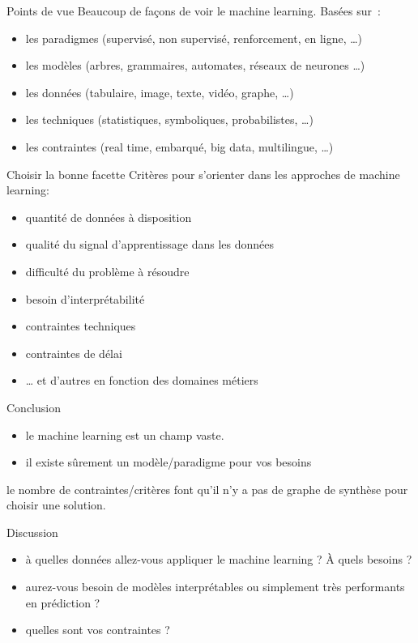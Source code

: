 \begin{frame}{Points de vue}
  Beaucoup de façons de voir le machine learning. Basées sur~:
  \begin{itemize}[<+->]
    \item les paradigmes (supervisé, non supervisé, renforcement, en
      ligne, …)
    \item les modèles (arbres, grammaires, automates, réseaux de
      neurones …)
    \item les données (tabulaire, image, texte, vidéo, graphe, …)
    \item les techniques (statistiques, symboliques, probabilistes, …)
    \item les contraintes (real time, embarqué, big data, multilingue,
      …)
  \end{itemize}

\end{frame}

\begin{frame}{Choisir la bonne facette}
  Critères pour s'orienter dans les approches de machine learning:
  \begin{itemize}[<+->]
  \item quantité de données à disposition
  \item qualité du signal d'apprentissage dans les données
  \item difficulté du problème à résoudre
  \item besoin d'interprétabilité
  \item contraintes techniques
  \item contraintes de délai
  \item … et d'autres en fonction des domaines métiers
  \end{itemize}
\end{frame}

\begin{frame}{Conclusion}
  \begin{itemize}
  \item le machine learning est un champ vaste.
  \item il existe sûrement un modèle/paradigme pour vos besoins
  \end{itemize}
  le nombre de contraintes/critères font qu'il n'y a pas de graphe de synthèse pour choisir une solution.
\end{frame}

\begin{frame}{Discussion}
  \begin{itemize}
  \item à quelles données allez-vous appliquer le machine learning ? À
    quels besoins ?
  \item aurez-vous besoin de modèles interprétables ou simplement très
    performants en prédiction ?
  \item quelles sont vos contraintes ?
  \end{itemize}
\end{frame}



